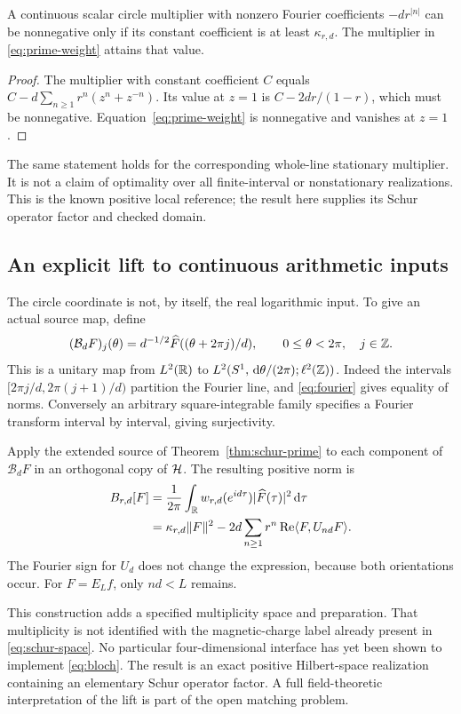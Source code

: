 \begin{corollary}
\label{cor:contact}
A continuous scalar circle multiplier with nonzero Fourier coefficients
$-dr^{|n|}$ can be nonnegative only if its constant coefficient is at
least $\kappa_{r,d}$. The multiplier in \eqref{eq:prime-weight} attains
that value.
\end{corollary}
\begin{proof}
The multiplier with constant coefficient $C$ equals
$C-d\sum_{n\geq1}r^n(z^n+z^{-n})$. Its value at $z=1$ is
$C-2dr/(1-r)$, which must be nonnegative. Equation~\eqref{eq:prime-weight}
is nonnegative and vanishes at $z=1$.
\end{proof}
The same statement holds for the corresponding whole-line stationary
multiplier. It is not a claim of optimality over all finite-interval
or nonstationary realizations. This is the known positive local reference;
the result here supplies its Schur operator factor and checked domain.

\subsection{An explicit lift to continuous arithmetic inputs}
The circle coordinate is not, by itself, the real logarithmic input.
To give an actual source map, define
\begin{equation}\label{eq:bloch}
 (\mathcal B_dF)_j(\theta)=d^{-1/2}
 \widehat F((\theta+2\pi j)/d),\qquad
 0\leq\theta<2\pi,\quad j\in\mathbb Z.
\end{equation}
This is a unitary map from $L^2(\mathbb R)$ to
$L^2(S^1,\,\mathrm d\theta/(2\pi);\ell^2(\mathbb Z))$. Indeed the intervals
$[2\pi j/d,2\pi(j+1)/d)$ partition the Fourier line, and
\eqref{eq:fourier} gives equality of norms. Conversely an arbitrary
square-integrable family specifies a Fourier transform interval by
interval, giving surjectivity.

Apply the extended source of Theorem~\ref{thm:schur-prime} to each
component of $\mathcal B_dF$ in an orthogonal copy of $\mathcal H$. The
resulting positive norm is
\begin{align}
 B_{r,d}[F]
 &=\frac1{2\pi}\int_\mathbb R w_{r,d}(e^{id\tau})
                   |\widehat F(\tau)|^2\,\mathrm d\tau\notag\\
 &=\kappa_{r,d}\lVert F\rVert^2
   -2d\sum_{n\geq1}r^n\operatorname{Re}\langle F,U_{nd}F\rangle.
 \label{eq:lifted-norm}
\end{align}
The Fourier sign for $U_d$ does not change the expression, because
both orientations occur. For $F=E_Lf$, only $nd<L$ remains.

This construction adds a specified multiplicity space and preparation.
That multiplicity is not identified with the magnetic-charge label
already present in \eqref{eq:schur-space}. No particular four-dimensional
interface has yet been shown to implement \eqref{eq:bloch}. The result
is an exact positive Hilbert-space realization containing an elementary
Schur operator factor. A full field-theoretic interpretation of the
lift is part of the open matching problem.
